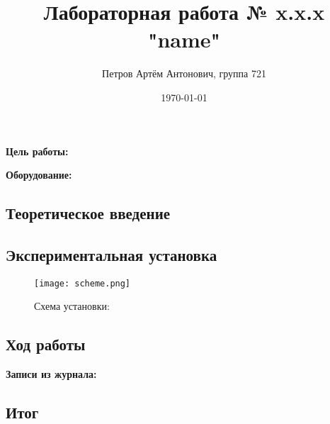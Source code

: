 \documentclass[a4paper,12pt]{article}
\author{Петров Артём Антонович, группа 721}
\title{Лабораторная работа № x.x.x "name"}
\date{\today}
\begin{document}

\begin{minipage}[t][7cm]{\textwidth}
\maketitle
\end{minipage}


\textbf{Цель работы:} 
\bigskip

\medskip
\textbf{Оборудование:} 
\bigskip

\subsection*{Теоретическое введение}
\bigskip


\bigskip

\subsection*{Экспериментальная установка}
\bigskip


\begin{figure}[ht]
\centering
\texttt{[image: scheme.png]}
\caption{Схема установки: }\label{schema}
\end{figure}

\bigskip

\subsection*{Ход работы}
\bigskip


\bigskip

\textbf{Записи из журнала:}
\bigskip


\bigskip

\subsection*{Итог}
\bigskip
 
\end{document}
